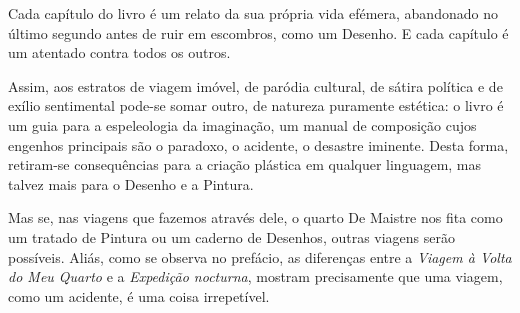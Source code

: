\documentclass[12pt]{article}
\begin{document}
Cada capítulo do livro é um relato da sua própria vida efémera,
abandonado no último segundo antes de ruir em escombros, como um
Desenho. E cada capítulo é um atentado contra todos os outros.

Assim, aos estratos de viagem imóvel, de paródia cultural, de sátira
política e de exílio sentimental pode-se somar outro, de natureza
puramente estética: o livro é um guia para a espeleologia da
imaginação, um manual de composição cujos engenhos principais são o
paradoxo, o acidente, o desastre iminente. Desta forma, retiram-se
consequências para a criação plástica em qualquer linguagem, mas
talvez mais para o Desenho e a Pintura.

Mas se, nas viagens que fazemos através dele, o quarto De Maistre nos
fita como um tratado de Pintura ou um caderno de Desenhos, outras
viagens serão possíveis. Aliás, como se observa no prefácio, as
diferenças entre a \emph{Viagem à Volta do Meu Quarto} e a
\emph{Expedição nocturna}, mostram precisamente que uma viagem, como
um acidente, é uma coisa irrepetível.

\renewcommand*{\bibfont}{\footnotesize}

\printbibliography[heading=bibliography,title={\hspace{1cm}Referências}]
\end{document}

